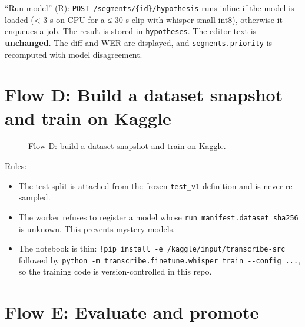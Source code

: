 \documentclass[11pt]{article}
\begin{document}
``Run model'' (R): \texttt{POST /\allowbreak{}segments/\allowbreak{}\{id\}/\allowbreak{}hypothesis} runs inline if the model is loaded (\textless{} 3 s on CPU for a ≤ 30 s clip with whisper-small int8), otherwise it enqueues a job. The result is stored in \texttt{hypotheses}. The editor text is \textbf{unchanged}. The diff and WER are displayed, and \texttt{segments.\allowbreak{}priority} is recomputed with model disagreement.

\hypertarget{flow-d-build-a-dataset-snapshot-and-train-on-kaggle}{%
\section{Flow D: Build a dataset snapshot and train on Kaggle}\label{flow-d-build-a-dataset-snapshot-and-train-on-kaggle}}

\begin{figure}[!htbp]\centering
\resizebox{\ifdim\width>\linewidth\linewidth\else\width\fi}{!}{}
\caption{Flow D: build a dataset snapshot and train on Kaggle.}
\end{figure}

Rules:

\begin{itemize}
\tightlist
\item
  The test split is attached from the frozen \texttt{test\_\allowbreak{}v1} definition and is never re-sampled.
\item
  The worker refuses to register a model whose \texttt{run\_\allowbreak{}manifest.\allowbreak{}dataset\_\allowbreak{}sha256} is unknown. This prevents mystery models.
\item
  The notebook is thin: \texttt{!pip install -\allowbreak{}e /\allowbreak{}kaggle/\allowbreak{}input/\allowbreak{}transcribe-\allowbreak{}src} followed by \texttt{python -\allowbreak{}m transcribe.\allowbreak{}finetune.\allowbreak{}whisper\_\allowbreak{}train -\allowbreak{}-\allowbreak{}config .\allowbreak{}.\allowbreak{}.\allowbreak{}}, so the training code is version-controlled in this repo.
\end{itemize}

\hypertarget{flow-e-evaluate-and-promote}{%
\section{Flow E: Evaluate and promote}\label{flow-e-evaluate-and-promote}}
\end{document}
